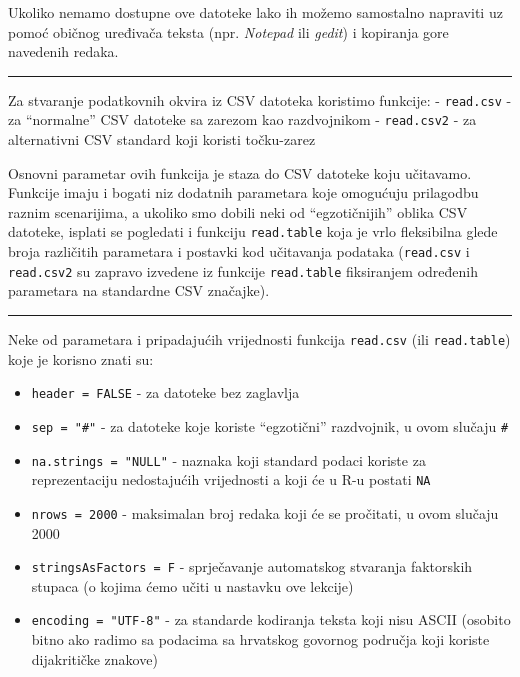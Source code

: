 \documentclass[]{book}
\providecommand{\tightlist}{%
  \setlength{\itemsep}{0pt}\setlength{\parskip}{0pt}}
\theoremstyle{definition}
\theoremstyle{definition}
\theoremstyle{definition}
\theoremstyle{remark}
\begin{document}
Ukoliko nemamo dostupne ove datoteke lako ih možemo samostalno napraviti
uz pomoć običnog uređivača teksta (npr. \emph{Notepad} ili \emph{gedit})
i kopiranja gore navedenih redaka.

\begin{center}\rule{0.5\linewidth}{\linethickness}\end{center}

Za stvaranje podatkovnih okvira iz CSV datoteka koristimo funkcije: -
\texttt{read.csv} - za ``normalne'' CSV datoteke sa zarezom kao
razdvojnikom - \texttt{read.csv2} - za alternativni CSV standard koji
koristi točku-zarez

Osnovni parametar ovih funkcija je staza do CSV datoteke koju učitavamo.
Funkcije imaju i bogati niz dodatnih parametara koje omogućuju
prilagodbu raznim scenarijima, a ukoliko smo dobili neki od
``egzotičnijih'' oblika CSV datoteke, isplati se pogledati i funkciju
\texttt{read.table} koja je vrlo fleksibilna glede broja različitih
parametara i postavki kod učitavanja podataka (\texttt{read.csv} i
\texttt{read.csv2} su zapravo izvedene iz funkcije \texttt{read.table}
fiksiranjem određenih parametara na standardne CSV značajke).

\begin{center}\rule{0.5\linewidth}{\linethickness}\end{center}

Neke od parametara i pripadajućih vrijednosti funkcija \texttt{read.csv}
(ili \texttt{read.table}) koje je korisno znati su:

\begin{itemize}
\tightlist
\item
  \texttt{header\ =\ FALSE} - za datoteke bez zaglavlja
\item
  \texttt{sep\ =\ "\#"} - za datoteke koje koriste ``egzotični''
  razdvojnik, u ovom slučaju \texttt{\#}
\item
  \texttt{na.strings\ =\ "NULL"} - naznaka koji standard podaci koriste
  za reprezentaciju nedostajućih vrijednosti a koji će u R-u postati
  \texttt{NA}
\item
  \texttt{nrows\ =\ 2000} - maksimalan broj redaka koji će se pročitati,
  u ovom slučaju 2000
\item
  \texttt{stringsAsFactors\ =\ F} - sprječavanje automatskog stvaranja
  faktorskih stupaca (o kojima ćemo učiti u nastavku ove lekcije)
\item
  \texttt{encoding\ =\ "UTF-8"} - za standarde kodiranja teksta koji
  nisu ASCII (osobito bitno ako radimo sa podacima sa hrvatskog govornog
  područja koji koriste dijakritičke znakove)
\end{itemize}
\end{document}
